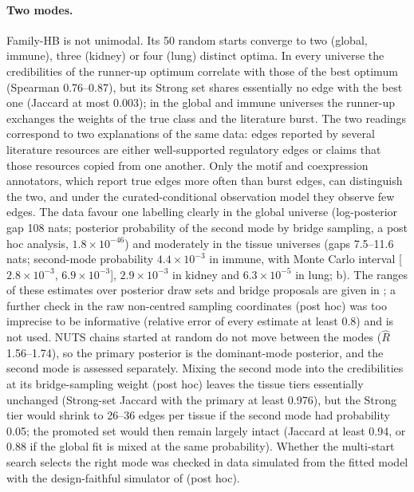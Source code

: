 \documentclass[11pt,a4paper]{article}
\begin{document}
\paragraph{Two modes.}
Family-HB is not unimodal.
Its 50 random starts converge to two (global, immune), three (kidney) or four (lung) distinct optima.
In every universe the credibilities of the runner-up optimum correlate with those of the best optimum (Spearman 0.76--0.87), but its Strong set shares essentially no edge with the best one (Jaccard at most 0.003); in the global and immune universes the runner-up exchanges the weights of the true class and the literature burst.
The two readings correspond to two explanations of the same data: edges reported by several literature resources are either well-supported regulatory edges or claims that those resources copied from one another.
Only the motif and coexpression annotators, which report true edges more often than burst edges, can distinguish the two, and under the curated-conditional observation model they observe few edges.
The data favour one labelling clearly in the global universe (log-posterior gap 108 nats; posterior probability of the second mode by bridge sampling, a post hoc analysis, \ensuremath{1.8\times10^{-46}}) and moderately in the tissue universes (gaps 7.5--11.6 nats; second-mode probability \ensuremath{4.4\times10^{-3}} in immune, with Monte Carlo interval [\ensuremath{2.8\times10^{-3}}, \ensuremath{6.9\times10^{-3}}], \ensuremath{2.9\times10^{-3}} in kidney and \ensuremath{6.3\times10^{-5}} in lung; b).
The ranges of these estimates over posterior draw sets and bridge proposals are given in ; a further check in the raw non-centred sampling coordinates (post hoc) was too imprecise to be informative (relative error of every estimate at least 0.8) and is not used.
NUTS chains started at random do not move between the modes ($\widehat{R}$ 1.56--1.74), so the primary posterior is the dominant-mode posterior, and the second mode is assessed separately.
Mixing the second mode into the credibilities at its bridge-sampling weight (post hoc) leaves the tissue tiers essentially unchanged (Strong-set Jaccard with the primary at least 0.976), but the Strong tier would shrink to 26--36 edges per tissue if the second mode had probability 0.05; the promoted set would then remain largely intact (Jaccard at least 0.94, or 0.88 if the global fit is mixed at the same probability).
Whether the multi-start search selects the right mode was checked in data simulated from the fitted model with the design-faithful simulator of  (post hoc).
\end{document}
